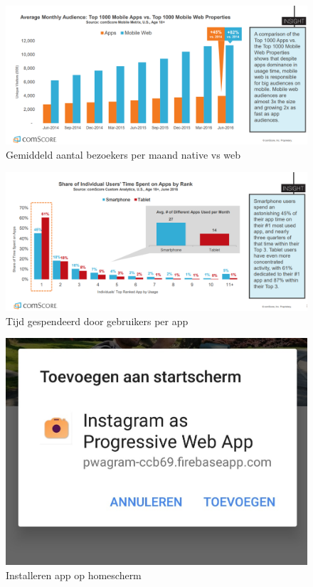 \documentclass[fleqn,a4paper,12pt]{book}
\begin{document}
\begin{figure}
	\includegraphics[scale=0.75]{img/visitors.png}
	\caption{Gemiddeld aantal bezoekers per maand native vs web }
	\label{fig:visitors}
\end{figure}
\begin{figure}
	\includegraphics[scale=0.75]{img/timeSpent.png}
	\caption{Tijd gespendeerd door gebruikers per app}
	\label{fig:timeSpent}
\end{figure}


\begin{figure}
	\includegraphics[scale=0.6]{img/installHome.jpg}
	\caption{Installeren app op homescherm}
	\label{fig:promptHome}
\end{figure}
\end{document}
